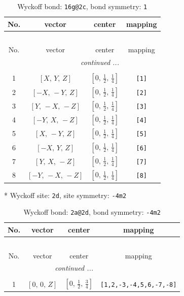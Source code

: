 \documentclass[fleqn,8pt]{jsarticle}
\begin{document}
\begin{longtable}{cccc}
\caption{Wyckoff bond: {\tt 16g@2c}, bond symmetry: {\tt 1}}
 \\
 \hline \hline
No. & vector & center & mapping \\ \hline \endfirsthead

\multicolumn{3}{l}{\tablename\ \thetable{}} \\
 \hline \hline
No. & vector & center & mapping \\ \hline \endhead

 \hline \hline
\multicolumn{3}{r}{\footnotesize\it continued ...} \\ \endfoot

 \hline \hline
\multicolumn{3}{r}{} \\ \endlastfoot

1 & $\left[ X,\, Y,\, Z \right]$ & $\left[ 0,\, \frac{1}{2},\, \frac{1}{4} \right]$ & {\tt [1]} \\ \hline
2 & $\left[ - X,\, - Y,\, Z \right]$ & $\left[ 0,\, \frac{1}{2},\, \frac{1}{4} \right]$ & {\tt [2]} \\ \hline
3 & $\left[ Y,\, - X,\, - Z \right]$ & $\left[ 0,\, \frac{1}{2},\, \frac{1}{4} \right]$ & {\tt [3]} \\ \hline
4 & $\left[ - Y,\, X,\, - Z \right]$ & $\left[ 0,\, \frac{1}{2},\, \frac{1}{4} \right]$ & {\tt [4]} \\ \hline
5 & $\left[ X,\, - Y,\, Z \right]$ & $\left[ 0,\, \frac{1}{2},\, \frac{1}{4} \right]$ & {\tt [5]} \\ \hline
6 & $\left[ - X,\, Y,\, Z \right]$ & $\left[ 0,\, \frac{1}{2},\, \frac{1}{4} \right]$ & {\tt [6]} \\ \hline
7 & $\left[ Y,\, X,\, - Z \right]$ & $\left[ 0,\, \frac{1}{2},\, \frac{1}{4} \right]$ & {\tt [7]} \\ \hline
8 & $\left[ - Y,\, - X,\, - Z \right]$ & $\left[ 0,\, \frac{1}{2},\, \frac{1}{4} \right]$ & {\tt [8]} \\
\end{longtable}
* Wyckoff site: {\tt 2d}, site symmetry: {\tt -4m2}
\renewcommand{\arraystretch}{1.2}
\begin{longtable}{cccc}
\caption{Wyckoff bond: {\tt 2a@2d}, bond symmetry: {\tt -4m2}}
 \\
 \hline \hline
No. & vector & center & mapping \\ \hline \endfirsthead

\multicolumn{3}{l}{\tablename\ \thetable{}} \\
 \hline \hline
No. & vector & center & mapping \\ \hline \endhead

 \hline \hline
\multicolumn{3}{r}{\footnotesize\it continued ...} \\ \endfoot

 \hline \hline
\multicolumn{3}{r}{} \\ \endlastfoot

1 & $\left[ 0,\, 0,\, Z \right]$ & $\left[ 0,\, \frac{1}{2},\, \frac{3}{4} \right]$ & {\tt [1,2,-3,-4,5,6,-7,-8]} \\
\end{longtable}
\end{document}
